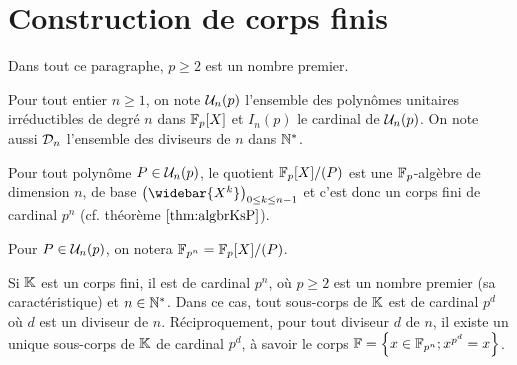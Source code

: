 \section{Construction de corps finis}

\begin{limi}
Dans tout ce paragraphe, $p \geq 2$ est un nombre premier. \newline

Pour tout entier $n \geq 1$, on note $\mathcal{U}_n(p)$ l'ensemble des polynômes unitaires irréductibles de degré $n$ dans $\mathbb{F}_p[X]$
et $I_n(p)$ le cardinal de $\mathcal{U}_n(p)$. On note aussi $\mathcal{D}_n$ l'ensemble des diviseurs de $n$ dans $\mathbb{N}^\ast$. \newline

Pour tout polynôme $P \in \mathcal{U}_n(p)$, le quotient $\mathbb{F}_p[X]/(P)$ est une $\mathbb{F}_p$-algèbre de dimension $n$, 
de base $\bigpar{\widebar{X^k}}_{0 \leq k \leq n-1}$ et c'est donc un corps fini de cardinal $p^n$ 
(cf. théorème $\ref{thm:algbrKsP}$). \newline

Pour $P \in \mathcal{U}_n(p)$, on notera $\mathbb{F}_{p^n} = \mathbb{F}_p[X]/(P)$.
\end{limi}

\begin{thm}
\label{thm:cardinal}
Si $\mathbb{K}$ est un corps fini, il est de cardinal $p^n$, où $p \geq 2$ est un nombre premier (sa caractéristique) et $n \in \mathbb{N}^\ast$.
Dans ce cas, tout sous-corps de $\mathbb{K}$ est de cardinal $p^d$ où $d$ est un diviseur de $n$.
Réciproquement, pour tout diviseur $d$ de $n$, il existe un unique sous-corps de $\mathbb{K}$ de cardinal $p^d$,
à savoir le corps $\mathbb{F} = \Bigl\{ x \in \mathbb{F}_{p^n} ; x^{p^d} = x  \Bigr\}$.
\end{thm}

